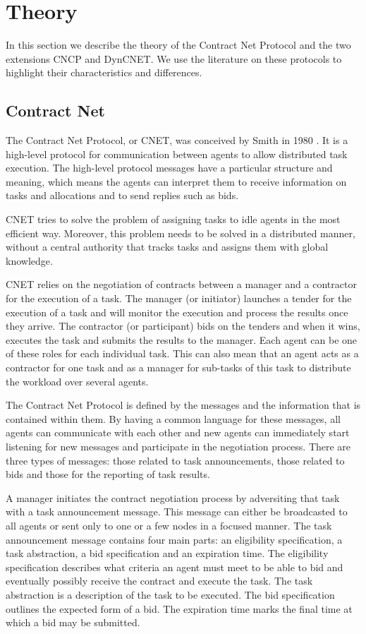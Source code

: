 \documentclass[10pt,a4paper,twocolumn]{article}
\begin{document}
\section{Theory}

In this section we describe the theory of the Contract Net Protocol and the two extensions CNCP and DynCNET. We use the literature on these protocols to highlight their characteristics and differences.

\subsection{Contract Net} The Contract Net Protocol, or CNET, was conceived by Smith in 1980 \cite{CNET}. It is a high-level protocol for communication between agents to allow distributed task execution. The high-level protocol messages have a particular structure and meaning, which means the agents can interpret them to receive information on tasks and allocations and to send replies such as bids. 

CNET tries to solve the problem of assigning tasks to idle agents in the most efficient way. Moreover, this problem needs to be solved in a distributed manner, without a central authority that tracks tasks and assigns them with global knowledge.

CNET relies on the negotiation of contracts between a manager and a contractor for the execution of a task. The manager (or initiator) launches a tender for the execution of a task and will monitor the execution and process the results once they arrive. The contractor (or participant) bids on the tenders and when it wins, executes the task and submits the results to the manager. Each agent can be one of these roles for each individual task. This can also mean that an agent acts as a contractor for one task and as a manager for sub-tasks of this task to distribute the workload over several agents.

The Contract Net Protocol is defined by the messages and the information that is contained within them. By having a common language for these messages, all agents can communicate with each other and new agents can immediately start listening for new messages and participate in the negotiation process. There are three types of messages: those related to task announcements, those related to bids and those for the reporting of task results.

A manager initiates the contract negotiation process by adversiting that task with a task announcement message. This message can either be broadcasted to all agents or sent only to one or a few nodes in a focused manner. The task announcement message contains four main parts: an eligibility specification, a task abstraction, a bid specification and an expiration time. The eligibility specification describes what criteria an agent must meet to be able to bid and eventually possibly receive the contract and execute the task. The task abstraction is a description of the task to be executed. The bid specification outlines the expected form of a bid. The expiration time marks the final time at which a bid may be submitted.
\end{document}
